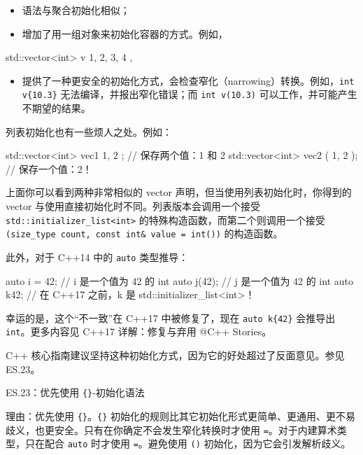 \begin{itemize}
\item 语法与聚合初始化相似；
\item 增加了用一组对象来初始化容器的方式。例如，
\end{itemize}

\begin{codebox}[cpp]
std::vector<int> v { 1, 2, 3, 4 },
\end{codebox}

\begin{itemize}
\item 提供了一种更安全的初始化方式，会检查窄化（narrowing）转换。例如，\texttt{int v\{10.3\}} 无法编译，并报出窄化错误；而 \texttt{int v(10.3)} 可以工作，并可能产生不期望的结果。
\end{itemize}

列表初始化也有一些烦人之处。例如：

\begin{codebox}[cpp]
std::vector<int> vec1 { 1, 2 }; // 保存两个值：1 和 2
std::vector<int> vec2 ( 1, 2 ); // 保存一个值：2！
\end{codebox}

上面你可以看到两种非常相似的 vector 声明，但当使用列表初始化时，你得到的 vector 与使用直接初始化时不同。列表版本会调用一个接受 \texttt{std::initializer\_list<int>} 的特殊构造函数，而第二个则调用一个接受 \texttt{(size\_type count, const int\& value = int())} 的构造函数。

此外，对于 C++14 中的 \texttt{auto} 类型推导：

\begin{codebox}[cpp]
auto i = 42;
// i 是一个值为 42 的 int
auto j(42);
// j 是一个值为 42 的 int
auto k{42};
// 在 C++17 之前，k 是 std::initializer_list<int>！
\end{codebox}

幸运的是，这个“不一致”在 C++17 中被修复了，现在 \texttt{auto k\{42\}} 会推导出 \texttt{int}。更多内容见 C++17 详解：修复与弃用 @C++ Stories。

C++ 核心指南建议坚持这种初始化方式，因为它的好处超过了反面意见。参见 ES.23。

\begin{myQuote}
ES.23：优先使用 \texttt{\{\}}-初始化语法

理由：优先使用 \texttt{\{\}}。\texttt{\{\}} 初始化的规则比其它初始化形式更简单、更通用、更不易歧义，也更安全。只有在你确定不会发生窄化转换时才使用 \texttt{=}。对于内建算术类型，只在配合 \texttt{auto} 时才使用 \texttt{=}。避免使用 \texttt{()} 初始化，因为它会引发解析歧义。
\end{myQuote}

